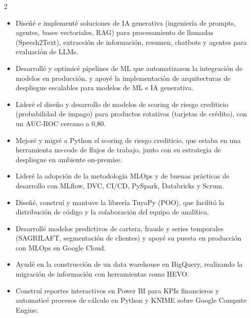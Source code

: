 \documentclass[10pt,a4paper,ragged2e,withhyper]{altacv}
\begin{document}
\begin{paracol}{2}
\begin{itemize}
\item Diseñé e implementé soluciones de IA generativa (ingeniería de prompts, agentes, bases vectoriales, RAG) para procesamiento de llamadas (Speech2Text), extracción de información, resumen, chatbots y agentes para evaluación de LLMs.
\item Desarrollé y optimicé pipelines de ML que automatizaron la integración de modelos en producción, y apoyé la implementación de arquitecturas de despliegue escalables para modelos de ML e IA generativa.
\end{itemize}

\switchcolumn


\begin{itemize}
\item Lideré el diseño y desarrollo de modelos de scoring de riesgo crediticio (probabilidad de impago) para productos rotativos (tarjetas de crédito), con un \mbox{AUC-ROC} cercano a 0,80.
\item Mejoré y migré a Python el scoring de riesgo crediticio, que estaba en una herramienta no-code de flujos de trabajo, junto con su estrategia de despliegue en ambiente \mbox{on-premise}.
\item Lideré la adopción de la metodología MLOps y de buenas prácticas de desarrollo con MLflow, DVC, CI/CD, PySpark, Databricks y Scrum.
\item Diseñé, construí y mantuve la librería TuyaPy (POO), que facilitó la distribución de código y la colaboración del equipo de analítica.
\end{itemize}

\divider


\begin{itemize}
\item Desarrollé modelos predictivos de cartera, fraude y series temporales (SAGRILAFT, segmentación de clientes) y apoyé su puesta en producción con MLOps en Google Cloud.
\item Ayudé en la construcción de un data warehouse en BigQuery, realizando la migración de información con herramientas como HEVO.
\item Construí reportes interactivos en Power BI para KPIs financieros y automaticé procesos de cálculo en Python y KNIME sobre Google Compute Engine.
\end{itemize}


\end{paracol}
\end{document}
